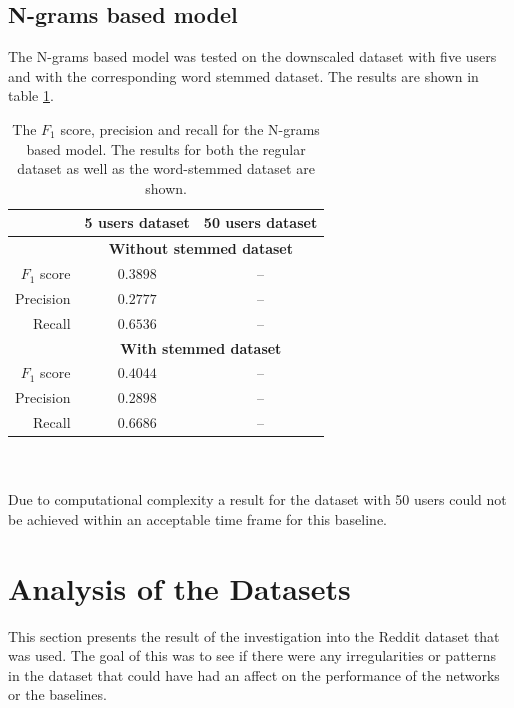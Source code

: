 \subsection{N-grams based model}
The N-grams based model was tested on the downscaled dataset with five users and with the corresponding word stemmed dataset. The results are shown in table \ref{table:ngram_results}.
\begin{table}[h!]
    \centering
    \begin{tabular}{ r | c | c }
     & \textbf{5 users dataset} & \textbf{50 users dataset} \\ \hline \hline
     & \multicolumn{2}{c}{\textbf{Without stemmed dataset}} \\ \hline \hline
    $F_1$ score & $0.3898$ & -- \\ \hline
    Precision & $0.2777$ & -- \\ \hline
    Recall & $0.6536$ & -- \\ \hline \hline
    & \multicolumn{2}{c}{\textbf{With stemmed dataset}} \\ \hline \hline
    $F_1$ score & $0.4044$ & -- \\ \hline
    Precision & $0.2898$ & -- \\ \hline
    Recall & $0.6686$ & -- \\ \hline
    \end{tabular}
    \caption{The $F_1$ score, precision and recall for the N-grams based model. The results for both the regular dataset as well as the word-stemmed dataset are shown.}
    \label{table:ngram_results}
\end{table}
\\\\
Due to computational complexity a result for the dataset with 50 users could not be achieved within an acceptable time frame for this baseline.

\section{Analysis of the Datasets}
\label{sec:dataset-summary}
This section presents the result of the investigation into the Reddit dataset that was used. The goal of this was to see if there were any irregularities or patterns in the dataset that could have had an affect on the performance of the networks or the baselines.

